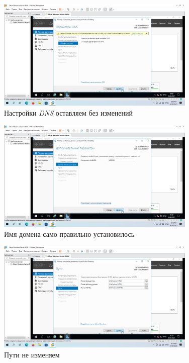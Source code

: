 \documentclass[a4paper]{article}
\begin{document}
  \begin{figure}[H]
    \centering
    \includegraphics[width=0.85\textwidth]{Screenshot_54}
    \caption{Настройки \textit{DNS} оставляем без изменений}
    \label{img:54}
  \end{figure}

  \begin{figure}[H]
    \centering
    \includegraphics[width=0.85\textwidth]{Screenshot_55}
    \caption{Имя домена само правильно установилось}
    \label{img:55}
  \end{figure}

  \begin{figure}[H]
    \centering
    \includegraphics[width=0.85\textwidth]{Screenshot_56}
    \caption{Пути не изменяем}
    \label{img:56}
  \end{figure}
\end{document}
